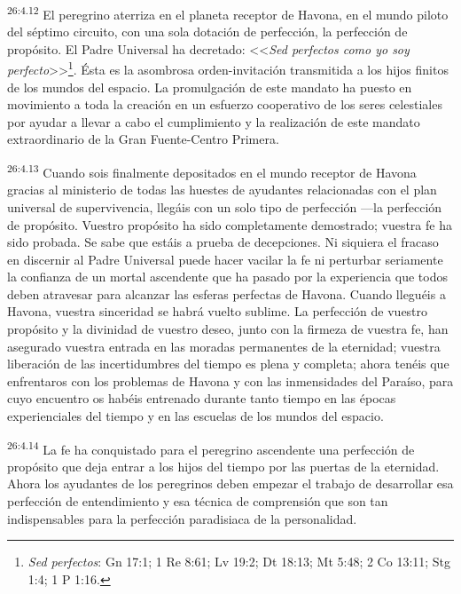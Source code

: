 \par
\textsuperscript{26:4.12} El peregrino aterriza en el planeta receptor de Havona, en el mundo piloto del séptimo circuito, con una sola dotación de perfección, la perfección de propósito. El Padre Universal ha decretado: <<\textit{Sed perfectos como yo soy perfecto}>>\footnote{\textit{Sed perfectos}: Gn 17:1; 1 Re 8:61; Lv 19:2; Dt 18:13; Mt 5:48; 2 Co 13:11; Stg 1:4; 1 P 1:16.}. Ésta es la asombrosa orden-invitación transmitida a los hijos finitos de los mundos del espacio. La promulgación de este mandato ha puesto en movimiento a toda la creación en un esfuerzo cooperativo de los seres celestiales por ayudar a llevar a cabo el cumplimiento y la realización de este mandato extraordinario de la Gran Fuente-Centro Primera.

\par
\textsuperscript{26:4.13} Cuando sois finalmente depositados en el mundo receptor de Havona gracias al ministerio de todas las huestes de ayudantes relacionadas con el plan universal de supervivencia, llegáis con un solo tipo de perfección ---la perfección de propósito. Vuestro propósito ha sido completamente demostrado; vuestra fe ha sido probada. Se sabe que estáis a prueba de decepciones. Ni siquiera el fracaso en discernir al Padre Universal puede hacer vacilar la fe ni perturbar seriamente la confianza de un mortal ascendente que ha pasado por la experiencia que todos deben atravesar para alcanzar las esferas perfectas de Havona. Cuando lleguéis a Havona, vuestra sinceridad se habrá vuelto sublime. La perfección de vuestro propósito y la divinidad de vuestro deseo, junto con la firmeza de vuestra fe, han asegurado vuestra entrada en las moradas permanentes de la eternidad; vuestra liberación de las incertidumbres del tiempo es plena y completa; ahora tenéis que enfrentaros con los problemas de Havona y con las inmensidades del Paraíso, para cuyo encuentro os habéis entrenado durante tanto tiempo en las épocas experienciales del tiempo y en las escuelas de los mundos del espacio.

\par
\textsuperscript{26:4.14} La fe ha conquistado para el peregrino ascendente una perfección de propósito que deja entrar a los hijos del tiempo por las puertas de la eternidad. Ahora los ayudantes de los peregrinos deben empezar el trabajo de desarrollar esa perfección de entendimiento y esa técnica de comprensión que son tan indispensables para la perfección paradisiaca de la personalidad.

